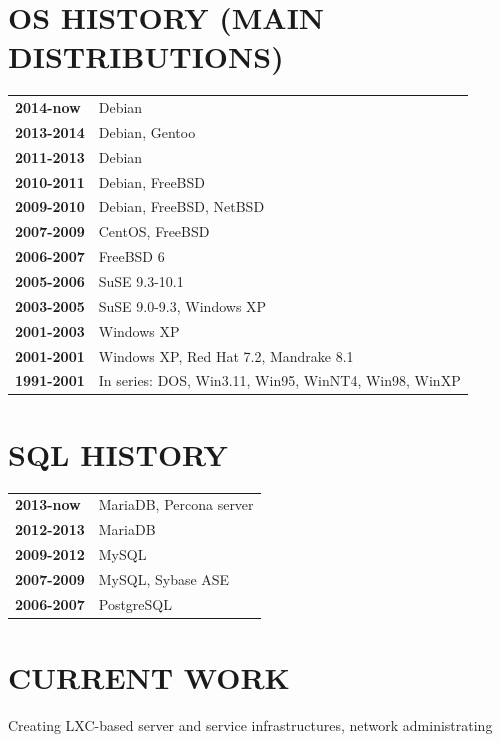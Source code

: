 \begin{resume}
\section{OS HISTORY (MAIN DISTRIBUTIONS)}
\vspace{0.1in} 
\begin{tabular}{ll}
{\bf 2014-now} & Debian\\
{\bf 2013-2014} & Debian, Gentoo\\
{\bf 2011-2013} & Debian\\
{\bf 2010-2011} & Debian, FreeBSD\\
{\bf 2009-2010} & Debian, FreeBSD, NetBSD\\
{\bf 2007-2009} & CentOS, FreeBSD\\
{\bf 2006-2007} & FreeBSD 6\\
{\bf 2005-2006} & SuSE 9.3-10.1\\
{\bf 2003-2005} & SuSE 9.0-9.3, Windows XP\\
{\bf 2001-2003} & Windows XP\\
{\bf 2001-2001} & Windows XP, Red Hat 7.2, Mandrake 8.1\\
{\bf 1991-2001} & In series: DOS, Win3.11, Win95, WinNT4, Win98, WinXP\\
\end{tabular}

\section{SQL HISTORY}
\vspace{0.1in} 
\begin{tabular}{ll}
{\bf 2013-now} & MariaDB, Percona server\\
{\bf 2012-2013} & MariaDB\\
{\bf 2009-2012} & MySQL\\
{\bf 2007-2009} & MySQL, Sybase ASE\\
{\bf 2006-2007} & PostgreSQL\\
\end{tabular}
\newpage
\section{CURRENT WORK}
\vspace{0.1in} 
    Creating LXC-based server and service infrastructures, network administrating


\end{resume}
